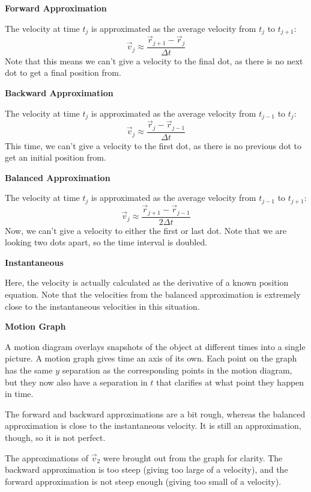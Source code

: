 \documentclass[]{article}
\begin{document}
\begin{TeacherMargin}
\noindent\textbf{Forward Approximation}

The velocity at time $t_{j}$ is approximated as the average velocity from $t_{j}$ to $t_{j+1}$:
\[
\vec{v}_{j} \approx \frac{\vec{r}_{j+1}-\vec{r}_{j}}{\Delta t}
\]
Note that this means we can't give a velocity to the final dot, as there is no next dot to get a final position from.

\noindent\textbf{Backward Approximation}

The velocity at time $t_{j}$ is approximated as the average velocity from $t_{j-1}$ to $t_{j}$:
\[
\vec{v}_{j} \approx \frac{\vec{r}_{j}-\vec{r}_{j-1}}{\Delta t}
\]
This time, we can't give a velocity to the first dot, as there is no previous dot to get an initial position from.

\noindent\textbf{Balanced Approximation}

The velocity at time $t_{j}$ is approximated as the average velocity from $t_{j-1}$ to $t_{j+1}$:
\[
\vec{v}_{j} \approx \frac{\vec{r}_{j+1}-\vec{r}_{j-1}}{2\Delta t}
\]
Now, we can't give a velocity to either the first or last dot. Note that we are looking two dots apart, so the time interval is doubled.

\noindent\textbf{Instantaneous}

Here, the velocity is actually calculated as the derivative of a known position equation. Note that the velocities from the balanced approximation is extremely close to the instantaneous velocities in this situation.

\noindent\textbf{Motion Graph}

A motion diagram overlays snapshots of the object at different times into a single picture. A motion graph gives time an axis of its own. Each point on the graph has the same $y$ separation as the corresponding points in the motion diagram, but they now also have a separation in $t$ that clarifies at what point they happen in time.

The forward and backward approximations are a bit rough, whereas the balanced approximation is close to the instantaneous velocity. It is still an approximation, though, so it is not perfect.

The approximations of $\vec{v}_{2}$ were brought out from the graph for clarity. The backward approximation is too steep (giving too large of a velocity), and the forward approximation is not steep enough (giving too small of a velocity).

\end{TeacherMargin}
\end{document}
